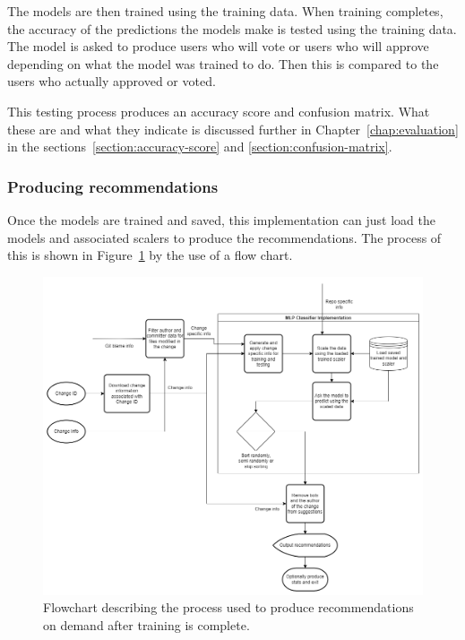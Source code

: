 The models are then trained using the training data. When training completes, the accuracy of the predictions the models make is tested using the training data. The model is asked to produce users who will vote or users who will approve depending on what the model was trained to do. Then this is compared to the users who actually approved or voted.

This testing process produces an accuracy score and confusion matrix. What these are and what they indicate is discussed further in Chapter~\ref{chap:evaluation} in the sections~\ref{section:accuracy-score} and \ref{section:confusion-matrix}.

\hspace{0.25cm}
\subsubsection{Producing recommendations}

Once the models are trained and saved, this implementation can just load the models and associated scalers to produce the recommendations. The process of this is shown in Figure~\ref{fig:neural-network-recommender-flowchart} by the use of a flow chart.

\begin{figure}[h]
    \centering
    \includegraphics[scale=0.375]{images/neural-network-recommender-after-training.png}
    \caption{Flowchart describing the process used to produce recommendations on demand after training is complete.}
    \label{fig:neural-network-recommender-flowchart}
\end{figure}

